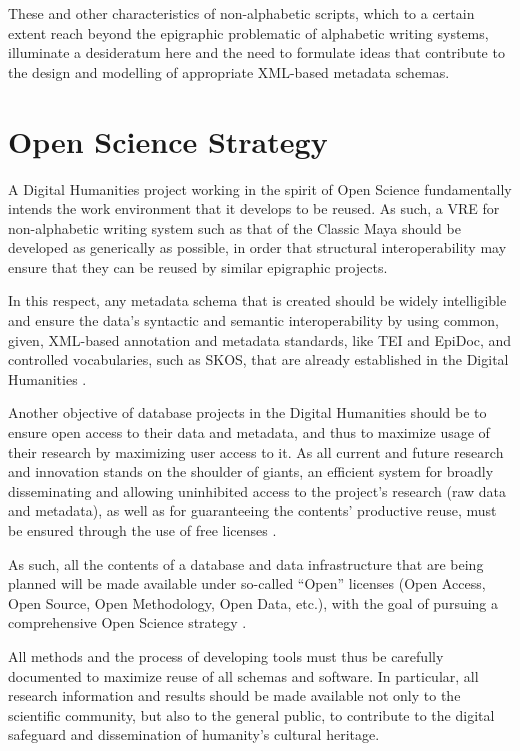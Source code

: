 \documentclass[amsthm,ebook]{saparticle}
\begin{document}
These and other characteristics of non-alphabetic scripts, which to a certain extent reach beyond the epigraphic
problematic of alphabetic writing systems, illuminate a desideratum here and the need to formulate ideas that
contribute to the design and modelling of appropriate XML-based metadata schemas. 




\section{Open Science Strategy}
 

\noindent A Digital Humanities project working in the spirit of Open Science fundamentally intends the work environment that it
develops to be reused. As such, a VRE for non-alphabetic writing system such as that of the Classic Maya should be
developed as generically as possible, in order that structural interoperability may ensure that they can be reused by
similar epigraphic projects.

In this respect, any metadata schema that is created should be widely intelligible and ensure the data’s syntactic and
semantic interoperability by using common, given, XML-based annotation and metadata standards, like TEI and EpiDoc, and
controlled vocabularies, such as SKOS, that are already established in the Digital Humanities \citep{Diederichs2015}.

Another objective of database projects in the Digital Humanities should be to ensure open access to their data and
metadata, and thus to maximize usage of their research by maximizing user access to it. As all current and future
research and innovation stands on the shoulder of giants, an efficient system for broadly disseminating and allowing
uninhibited access to the project’s research (raw data and metadata), as well as for guaranteeing the contents’
productive reuse, must be ensured through the use of free licenses \citep{DFG2014}. 

As such, all the contents of a database and data infrastructure that are being planned will be made available under
so-called ``Open'' licenses (Open Access, Open Source, Open Methodology, Open Data, etc.), with the goal of pursuing a
comprehensive Open Science strategy \citep{Diederichs2015}. 

All methods and the process of developing tools must thus be carefully documented to maximize reuse of all schemas and
software. In particular, all research information and results should be made available not only to the scientific
community, but also to the general public, to contribute to the digital safeguard and dissemination of humanity’s
cultural heritage. 
\end{document}
